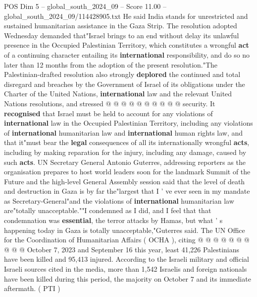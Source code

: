 \begin{textsample}{POS Dim 5 – global\_south\_2024\_09 – Score 11.00 – global\_south\_2024\_09/114428905.txt}
He said India stands for unrestricted and sustained humanitarian assistance in the Gaza Strip.
The resolution adopted Wednesday demanded that"Israel brings to an end without delay its unlawful presence in the Occupied Palestinian Territory, which constitutes a wrongful \textbf{act} of a continuing character entailing its \textbf{international} responsibility, and do so no later than 12 months from the adoption of the present resolution."The Palestinian-drafted resolution also strongly \textbf{deplored} the continued and total disregard and breaches by the Government of Israel of its obligations under the Charter of the United Nations, \textbf{international} law and the relevant United Nations resolutions, and stressed @ @ @ @ @ @ @ @ @ @ security.
It \textbf{recognised} that Israel must be held to account for any violations of \textbf{international} law in the Occupied Palestinian Territory, including any violations of \textbf{international} humanitarian law and \textbf{international} human rights law, and that it"must bear the \textbf{legal} consequences of all its internationally wrongful \textbf{acts}, including by making reparation for the injury, including any damage, caused by such \textbf{acts}.
UN Secretary General Antonio Guterres, addressing reporters as the organisation prepares to host world leaders soon for the landmark Summit of the Future and the high-level General Assembly session said that the level of death and destruction in Gaza is by far the"largest that I ' ve ever seen in my mandate as Secretary-General"and the violations of \textbf{international} humanitarian law are"totally unacceptable.""I condemned as I did, and I feel that that condemnation was \textbf{essential}, the terror attacks by Hamas, but what ' s happening today in Gaza is totally unacceptable,"Guterres said.
The UN Office for the Coordination of Humanitarian Affairs ( OCHA ), citing @ @ @ @ @ @ @ @ @ @ October 7, 2023 and September 16 this year, least 41,226 Palestinians have been killed and 95,413 injured.
According to the Israeli military and official Israeli sources cited in the media, more than 1,542 Israelis and foreign nationals have been killed during this period, the majority on October 7 and its immediate aftermath. ( PTI )

\end{textsample}
